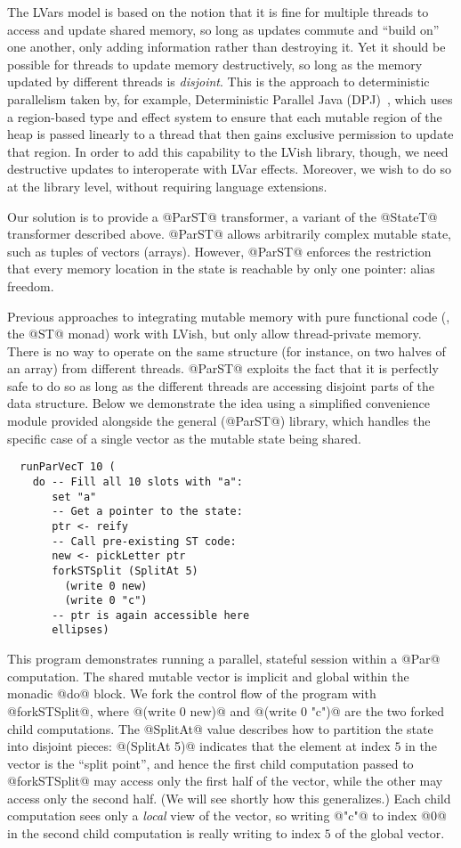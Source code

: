 The LVars model is based on the notion that it is fine for multiple
threads to access and update shared memory, so long as updates commute
and ``build on'' one another, only adding information rather than
destroying it.  Yet it should be possible for threads to update memory
destructively, so long as the memory updated by different threads is
\emph{disjoint}.  This is the approach to deterministic parallelism
taken by, for example, Deterministic Parallel Java
(DPJ)~\cite{dpj-oopsla}, which uses a region-based type and effect
system to ensure that each mutable region of the heap is passed
linearly to a thread that then gains exclusive permission to update
that region.  In order to add this capability to the LVish library,
though, we need destructive updates to interoperate with LVar effects.
Moreover, we wish to do so at the library level, without requiring
language extensions.

Our solution is to provide a @ParST@ transformer, a variant of the
@StateT@ transformer described above.  @ParST@ allows arbitrarily
complex mutable state, such as tuples of vectors (arrays).  However,
@ParST@ enforces the restriction that {every} memory location in the
state is reachable by only one pointer: alias freedom.

Previous approaches to integrating mutable memory with pure functional
code (\ie, the @ST@ monad) work with LVish, but only allow
thread-private memory.  There is no way to operate on the same
structure (for instance, on two halves of an array) from different
threads.  @ParST@ exploits the fact that it is perfectly safe to do so
as long as the different threads are accessing disjoint parts of the
data structure.  Below we demonstrate the idea using a simplified
convenience module provided alongside the general (@ParST@) library,
which handles the specific case of a single vector as the mutable
state being shared.

\singlespacing
\begin{lstlisting}
  runParVecT 10 (
    do -- Fill all 10 slots with "a":
       set "a"
       -- Get a pointer to the state:
       ptr <- reify 
       -- Call pre-existing ST code:
       new <- pickLetter ptr
       forkSTSplit (SplitAt 5)
         (write 0 new)
         (write 0 "c")
       -- ptr is again accessible here
       ellipses)
\end{lstlisting}
\doublespacing

This program demonstrates running a parallel, stateful session within
a @Par@ computation.  The shared mutable vector is implicit and global
within the monadic @do@ block.  We fork the control flow of the
program with @forkSTSplit@, where @(write 0 new)@ and @(write 0 "c")@
are the two forked child computations.  The @SplitAt@ value describes
how to partition the state into disjoint pieces: @(SplitAt 5)@
indicates that the element at index $5$ in the vector is the ``split
point'', and hence the first child computation passed to @forkSTSplit@
may access only the first half of the vector, while the other may
access only the second half.  (We will see shortly how this
generalizes.)  Each child computation sees only a \emph{local} view of
the vector, so writing @"c"@ to index @0@ in the second child
computation is really writing to index $5$ of the global vector.

